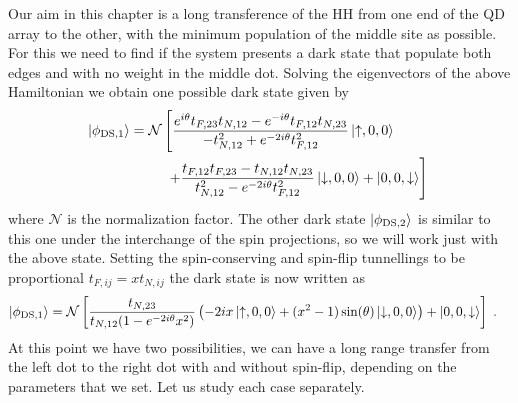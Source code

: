 Our aim in this chapter is a long transference of the HH from one end of the QD array to the other, with the minimum population of the middle site as possible. For this we need to find if the system presents a dark state that populate both edges and with no weight in the middle dot. Solving the eigenvectors of the above Hamiltonian we obtain one possible dark state given by
\begin{equation}
	\begin{split}
	\ket{\phi_{\text{DS},1}}=\mathcal{N}&\left[\frac{e^{i\theta}t_{F,23}t_{N,12}-e^{-i\theta}t_{F,12}t_{N,23}}{-t_{N,12}^2+e^{-2i\theta}t_{F,12}^2}\ket{\uparrow,0,0}\right.\\
	&\;\left.+\frac{t_{F,12}t_{F,23}-t_{N,12}t_{N,23}}{t_{N,12}^2-e^{-2i\theta}t_{F,12}^2}\ket{\downarrow,0,0}+\ket{0,0,\downarrow}\right]\;
\end{split}
\end{equation}
where $\mathcal{N}$ is the normalization factor. The other dark state $\ket{\phi_{\text{DS},2}}$ is similar to this one under the interchange of the spin projections, so we will work just with the above state. Setting the spin-conserving and spin-flip tunnellings to be proportional $t_{F,ij}=xt_{N,ij}$ the dark state is now written as
\begin{equation}
	\begin{split}
	\ket{\phi_{\text{DS},1}}=\mathcal{N}&\left[\frac{t_{N,23}}{t_{N,12}(1-e^{-2i\theta}x^2)}\left(-2ix\ket{\uparrow,0,0}+(x^2-1)\sin(\theta)\ket{\downarrow,0,0}\right)+\ket{0,0,\downarrow}\right]\;.
	\label{eq:dark_state}
	\end{split}
\end{equation}
At this point we have two possibilities, we can have a long range transfer from the left dot to the right dot with and without spin-flip, depending on the parameters that we set. Let us study each case separately.

